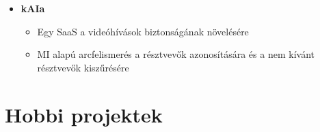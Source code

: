 \documentclass[letterpaper]{twentysecondcv} %
\begin{document}
{\begin{itemize}[leftmargin=0.5cm, rightmargin=0.5cm]
\begin{itemize}
			      \item Egy SaaS COVID-19 megbetegedéssel kapcsolatos adatok előrejelzésére
			      \item Orvosokkal és kutatókkal együttműködés
			      \item Statisztikai alapú előrejelzések készítése a rendelkezésre álló adatok alapján
		      \end{itemize}
		\item \vspace{1em} \textbf{kAIa} \vspace{0.5em}
		      \begin{itemize}
			      \item Egy SaaS a videóhívások biztonságának növelésére
			      \item MI alapú arcfelismerés a résztvevők azonosítására és a nem kívánt résztvevők kiszűrésére
		      \end{itemize}
	\end{itemize}}

\newpage


\section{Hobbi projektek}
\end{document}
